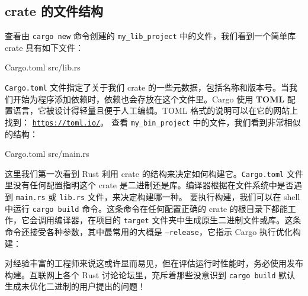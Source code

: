 \subsection{crate 的文件结构}
\label{idx:idx_7d168d97}
查看由 \texttt{cargo new} 命令创建的 \texttt{my\_\allowbreak{}lib\_\allowbreak{}project} 中的文件，我们看到一个简单库 crate 具有如下文件：
\begin{codeboxdark}
Cargo.toml
src/lib.rs
\end{codeboxdark}
\label{idx:idx_506a0817}
\label{idx:idx_9fb464aa}
\texttt{Cargo.toml} 文件指定了关于我们 crate 的一些元数据，包括名称和版本号。当我们开始为程序添加依赖时，依赖也会存放在这个文件里。Cargo 使用 \textbf{TOML} 配置语言，它被设计得轻量且便于人工编辑。TOML 格式的说明可以在它的网站上找到：
\href{https://toml.io/}{\texttt{https:/\allowbreak{}/\allowbreak{}toml.\allowbreak{}io/\allowbreak{}}}。
查看 \texttt{my\_\allowbreak{}bin\_\allowbreak{}project} 中的文件，我们看到非常相似的结构：
\begin{codeboxdark}
Cargo.toml
src/main.rs
\end{codeboxdark}
这里我们第一次看到 Rust 利用 crate 的结构来决定如何构建它。\texttt{Cargo.toml} 文件里没有任何配置指明这个 crate 是二进制还是库。编译器根据在文件系统中是否遇到
\texttt{main.rs} 或 \texttt{lib.rs} 文件，来决定构建哪一种。
要执行构建，我们可以在 shell 中运行 \texttt{cargo build} 命令。这条命令在任何配置正确的 crate 的根目录下都能工作，它会调用编译器，在项目的 \texttt{target} 文件夹中生成原生二进制文件或库。这条命令还接受各种参数，其中最常用的大概是 \texttt{--release}，它指示 Cargo 执行优化构建：
\label{idx:idx_e9258c78}
对经验丰富的工程师来说这或许显而易见，但在评估运行时性能时，务必使用发布构建。互联网上各个 Rust 讨论论坛里，充斥着那些没意识到 \texttt{cargo build} 默认生成未优化二进制的用户提出的问题！
